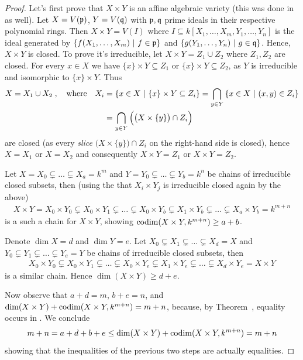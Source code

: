\documentclass[a4paper,parskip=half,numbers=enddot, DIV=12]{scrreprt}
\begin{document}
\begin{proof}
	Let's first prove that $X\times Y$ is an affine algebraic variety (this was done in \cite[proof of Proposition~2.2.6]{alg1} as well). Let $X=V(\mathfrak{p})$, $Y=V(\mathfrak{q})$ with $\mathfrak{p},\mathfrak{q}$ prime ideals in their respective polynomial rings. Then $X\times Y=V(I)$ where $I\subseteq k[X_1,\ldots,X_m,Y_1,\ldots,Y_n]$ is  the ideal generated by $\left\{f(X_1,\ldots,X_m)\ \middle|\  f\in\mathfrak{p}\right\}$ and $\left\{g(Y_1,\ldots,Y_n)\ \middle|\  g\in\mathfrak{q}\right\}$. Hence, $X\times Y$ is closed.
    To prove it's irreducible, let $X\times Y = Z_1\cup Z_2$ where $Z_1,Z_2$ are closed. For every $x\in X$ we have $\{x\}\times Y\subseteq Z_1$ or $\{x\}\times Y\subseteq Z_2$, as $Y$ is irreducible and isomorphic to $\{x\}\times Y$. Thus 
    \begin{align*}
    	X= X_1\cup X_2\;,\quad\text{where}\quad X_i&=\left\{x\in X\ \middle|\  \{x\}\times Y\subseteq Z_i\right\} = \bigcap_{y\in Y}\left\{x\in X\ \middle|\  (x,y)\in Z_i\right\}\\
    	&=\bigcap_{y\in Y} \Big(\big(X\times\{y\}\big)\cap Z_i\Big)
    \end{align*}
    are closed (as every \emph{slice} $\big(X\times\{y\}\big)\cap Z_i$ on the right-hand side is closed), hence $X=X_1$ or $X=X_2$ and consequently $X\times Y = Z_1$ or $X\times Y=Z_2$.
    
	Let $X= X_0\subsetneq \ldots\subsetneq X_a=k^m$ and $Y= Y_0\subsetneq \ldots\subsetneq Y_b=k^n$ be chains of irreducible closed subsets, then (using the that $X_i\times Y_j$ is irreducible closed again by the above)
    \begin{align*}
        X\times Y = X_0\times Y_0 \subsetneq X_0\times Y_1\subsetneq\ldots\subsetneq X_0\times Y_b\subsetneq X_1\times Y_b\subsetneq \ldots\subsetneq X_a\times Y_b = k^{m+n}
    \end{align*}
    is a such a chain for $X\times Y$, showing $\operatorname{codim}(X\times Y,k^{m+n})\geq a+b$.
    
	Denote $\dim X=d$ and $\dim Y=e$. Let $X_0\subsetneq X_1\subsetneq \ldots\subsetneq X_d=X$ and $Y_0\subsetneq Y_1\subsetneq \ldots\subsetneq Y_e=Y$ be chains of irreducible closed subsets, then 
    \begin{align*}
        X_0\times Y_0 \subsetneq X_0\times Y_1\subsetneq\ldots\subsetneq X_0\times Y_e\subsetneq X_1\times Y_e\subsetneq \ldots\subsetneq X_d\times Y_e =X \times Y
    \end{align*}
    is a similar chain. Hence $\dim(X\times Y)\geq d+e$.
    
    Now observe that $a+d=m$, $b+e=n$, and $\dim(X\times Y)+\operatorname{codim}(X\times Y,k^{m+n}) = m+n$, because, by Theorem~, equality occurs in . We conclude
    \begin{align*}
        m+n = a+d+b+e \leq \dim(X\times Y) +\operatorname{codim}(X\times Y,k^{m+n}) = m+n
    \end{align*}
    showing that the inequalities of the previous two steps are actually equalities.
\end{proof}
\end{document}
